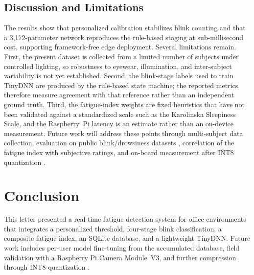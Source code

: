 \documentclass{IEEE_lsens}
\begin{document}
\subsection{Discussion and Limitations}
The results show that personalized calibration stabilizes blink counting and
that a 3{,}172-parameter network reproduces the rule-based staging at
sub-millisecond cost, supporting framework-free edge deployment. Several
limitations remain. First, the present dataset is collected from a limited
number of subjects under controlled lighting, so robustness to eyewear,
illumination, and inter-subject variability is not yet established. Second,
the blink-stage labels used to train TinyDNN are produced by the rule-based
state machine; the reported metrics therefore measure agreement with that
reference rather than an independent ground truth. Third, the fatigue-index
weights are fixed heuristics that have not been validated against a
standardized scale such as the Karolinska Sleepiness Scale, and the
Raspberry~Pi latency is an estimate rather than an on-device measurement.
Future work will address these points through multi-subject data collection,
evaluation on public blink/drowsiness datasets \cite{ghoddoosian2019},
correlation of the fatigue index with subjective ratings, and on-board
measurement after INT8 quantization \cite{jacob2018}.

\section{Conclusion}
This letter presented a real-time fatigue detection system for office
environments that integrates a personalized threshold, four-stage blink
classification, a composite fatigue index, an SQLite database, and a
lightweight TinyDNN. Future work includes per-user model fine-tuning from the
accumulated database, field validation with a Raspberry Pi Camera Module~V3,
and further compression through INT8 quantization \cite{jacob2018}.
\end{document}
